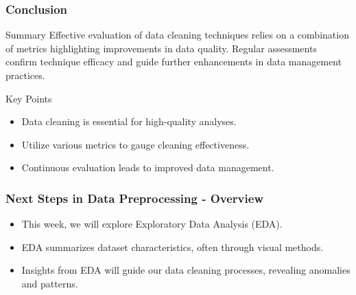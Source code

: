 \documentclass[aspectratio=169]{beamer}
\begin{document}
\begin{frame}[fragile]
    \frametitle{Conclusion}
    \begin{block}{Summary}
        Effective evaluation of data cleaning techniques relies on a combination of metrics highlighting improvements in data quality. Regular assessments confirm technique efficacy and guide further enhancements in data management practices.
    \end{block}

    \begin{block}{Key Points}
        \begin{itemize}
            \item Data cleaning is essential for high-quality analyses.
            \item Utilize various metrics to gauge cleaning effectiveness.
            \item Continuous evaluation leads to improved data management.
        \end{itemize}
    \end{block}
\end{frame}

\begin{frame}[fragile]
    \frametitle{Next Steps in Data Preprocessing - Overview}
    \begin{itemize}
        \item This week, we will explore Exploratory Data Analysis (EDA).
        \item EDA summarizes dataset characteristics, often through visual methods.
        \item Insights from EDA will guide our data cleaning processes, revealing anomalies and patterns.
    \end{itemize}
\end{frame}
\end{document}
